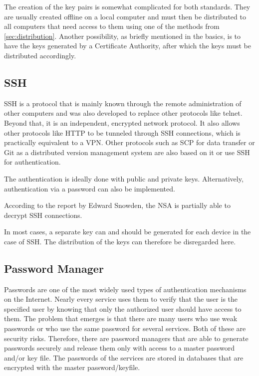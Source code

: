 \documentclass[12pt,oneside,a4paper,parskip]{scrbook}
\begin{document}
The creation of the key pairs is somewhat complicated for both standards. They are usually created offline on a local computer and must then be distributed to all computers that need access to them using one of the methods from \ref{sec:distribution}. Another possibility, as briefly mentioned in the basics, is to have the keys generated by a Certificate Authority, after which the keys must be distributed accordingly.


\subsection{SSH}
SSH is a protocol that is mainly known through the remote administration of other computers and was also developed to replace other protocols like telnet.  Beyond that, it is an independent, encrypted network protocol. It also allows other protocols like HTTP to be tunneled through SSH connections, which is practically equivalent to a VPN. Other protocols such as SCP for data transfer or Git as a distributed version management system are also based on it or use SSH for authentication. 

The authentication is ideally done with public and private keys. Alternatively, authentication via a password can also be implemented. 

According to the report by Edward Snowden, the NSA is partially able to decrypt SSH connections.

In most cases, a separate key can and should be generated for each device in the case of SSH. The distribution of the keys can therefore be disregarded here.


\subsection{Password Manager}
Passwords are one of the most widely used types of authentication mechanisms on the Internet. Nearly every service uses them to verify that the user is the specified user by knowing that only the authorized user should have access to them. The problem that emerges is that there are many users who use weak passwords or who use the same password for several services. Both of these are security risks. Therefore, there are password managers that are able to generate passwords securely and release them only with access to a master password and/or key file. The passwords of the services are stored in databases that are encrypted with the master password/keyfile.
\end{document}
